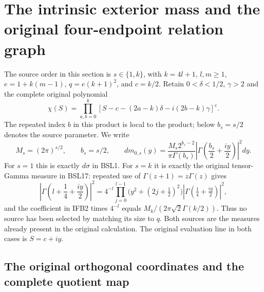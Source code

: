 \documentclass[11pt,a4paper]{article}
\begin{document}

\clearpage

\section{The intrinsic exterior mass and the original four-endpoint relation graph}
\label{sec:IFB}

The source order in this section is $s\in\{1,k\}$, with
$k=4l+1$, $l,m\geq1$, $e=1+k(m-1)$,
$q=e(k+1)^2$, and $c=k/2$.
Retain $0<\delta<1/2$, $\gamma>2$ and the complete original polynomial
\[
 \chi(S)=\prod_{a,b=0}^k
 [S-c-(2a-k)\delta-i(2b-k)\gamma]^e.
 \tag{IFB1}
\]
The repeated index $b$ in this product is local to the product; below
$b_s=s/2$ denotes the source parameter. We write
\[
 M_s=(2\pi)^{s/2},\qquad b_s=s/2,\qquad
 dm_{0,s}(y)=
 \frac{M_s2^{b_s-2}}{\pi\Gamma(b_s)}
 \left|\Gamma\left(\frac{b_s}{2}+\frac{iy}{2}\right)\right|^2dy.
 \tag{IFB2}
\]
For $s=1$ this is exactly $d\sigma$ in BSL1. For $s=k$ it is
exactly the original tensor-Gamma measure in BSL17: repeated use of
$\Gamma(z+1)=z\Gamma(z)$ gives
\[
 \left|\Gamma\left(l+\frac14+\frac{iy}{2}\right)\right|^2
 =4^{-l}\prod_{j=0}^{l-1}\bigl(y^2+(2j+\tfrac12)^2\bigr)
       |\Gamma(\tfrac14+\tfrac{iy}{2})|^2,
\]
and the coefficient in IFB2 times $4^{-l}$ equals
$M_k/(2\pi\sqrt2\Gamma(k/2))$. Thus no source has been selected
by matching its size to $q$. Both sources are the measures already
present in the original calculation. The original evaluation line in
both cases is $S=c+iy$.

\subsection{The original orthogonal coordinates and the complete quotient map}
\end{document}
